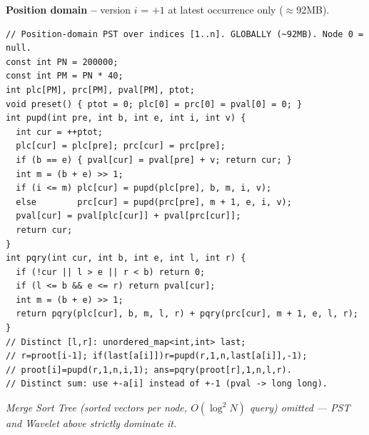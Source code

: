 \textbf{Position domain --} version $i$ = $+1$ at latest occurrence only ($\approx$92MB).
\begin{verbatim}
// Position-domain PST over indices [1..n]. GLOBALLY (~92MB). Node 0 = null.
const int PN = 200000;
const int PM = PN * 40;
int plc[PM], prc[PM], pval[PM], ptot;
void preset() { ptot = 0; plc[0] = prc[0] = pval[0] = 0; }
int pupd(int pre, int b, int e, int i, int v) {
  int cur = ++ptot;
  plc[cur] = plc[pre]; prc[cur] = prc[pre];
  if (b == e) { pval[cur] = pval[pre] + v; return cur; }
  int m = (b + e) >> 1;
  if (i <= m) plc[cur] = pupd(plc[pre], b, m, i, v);
  else        prc[cur] = pupd(prc[pre], m + 1, e, i, v);
  pval[cur] = pval[plc[cur]] + pval[prc[cur]];
  return cur;
}
int pqry(int cur, int b, int e, int l, int r) {
  if (!cur || l > e || r < b) return 0;
  if (l <= b && e <= r) return pval[cur];
  int m = (b + e) >> 1;
  return pqry(plc[cur], b, m, l, r) + pqry(prc[cur], m + 1, e, l, r);
}
// Distinct [l,r]: unordered_map<int,int> last;
// r=proot[i-1]; if(last[a[i]])r=pupd(r,1,n,last[a[i]],-1);
// proot[i]=pupd(r,1,n,i,1); ans=pqry(proot[r],1,n,l,r).
// Distinct sum: use +-a[i] instead of +-1 (pval -> long long).
\end{verbatim}
\textit{Merge Sort Tree (sorted vectors per node, $O(\log^2 N)$ query) omitted --- PST and Wavelet above strictly dominate it.}

